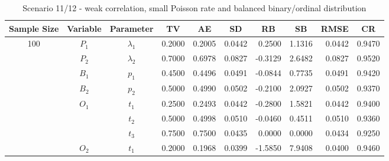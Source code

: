 \documentclass[letterpaper]{article}
\begin{document}
\begin{table}[h]
\centering
\caption{Scenario 11/12 - weak correlation, small Poisson rate and balanced binary/ordinal distribution}
\begin{tabular}{cccrrrrrrr}
\hline
Sample Size & Variable    & Parameter      & \multicolumn{1}{c}{TV} & \multicolumn{1}{c}{AE} & \multicolumn{1}{c}{SD} & \multicolumn{1}{c}{RB} & \multicolumn{1}{c}{SB} & \multicolumn{1}{c}{RMSE} & \multicolumn{1}{c}{CR} \\\hline
100         & $P_1$       & $\lambda_1$    & 0.2000                 & 0.2005                 & 0.0442                 & 0.2500                 & 1.1316                 & 0.0442                   & 0.9470                 \\
            & $P_2$       & $\lambda_2$    & 0.7000                 & 0.6978                 & 0.0827                 & -0.3129                & 2.6482                 & 0.0827                   & 0.9520                 \\
            & $B_1$       & $p_1$          & 0.4500                 & 0.4496                 & 0.0491                 & -0.0844                & 0.7735                 & 0.0491                   & 0.9420                 \\
            & $B_2$       & $p_2$          & 0.5000                 & 0.4990                 & 0.0502                 & -0.2100                & 2.0927                 & 0.0502                   & 0.9370                 \\
            & $O_1$       & $t_1$          & 0.2500                 & 0.2493                 & 0.0442                 & -0.2800                & 1.5821                 & 0.0442                   & 0.9400                 \\
            &             & $t_2$          & 0.5000                 & 0.4998                 & 0.0510                 & -0.0460                & 0.4511                 & 0.0510                   & 0.9360                 \\
            &             & $t_3$          & 0.7500                 & 0.7500                 & 0.0435                 & 0.0000                 & 0.0000                 & 0.0434                   & 0.9250                 \\
            & $O_2$       & $t_1$          & 0.2000                 & 0.1968                 & 0.0399                 & -1.5850                & 7.9408                 & 0.0400                   & 0.9460                 \\

\end{tabular}
\end{table}
\end{document}
